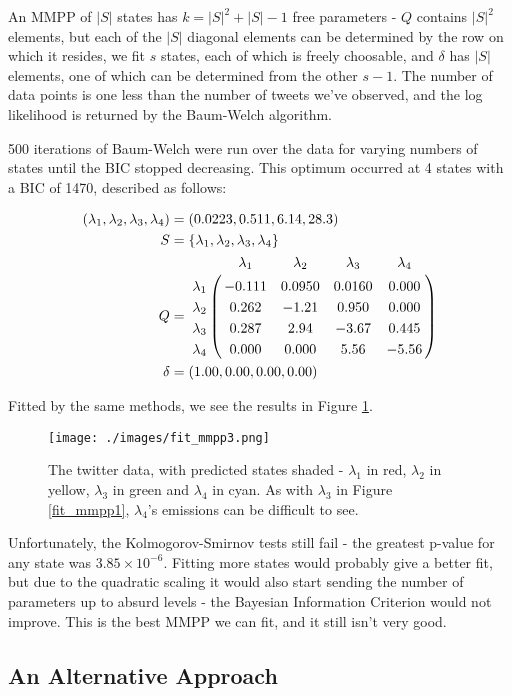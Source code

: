 An MMPP of $|S|$ states has $k=|S|^2+|S|-1$ free parameters - $Q$ contains $|S|^2$ elements, but each of the $|S|$ diagonal elements can be determined by the row on which it resides, we fit $s$ states, each of which is freely choosable, and $\delta$ has $|S|$ elements, one of which can be determined from the other $s-1$. The number of data points is one less than the number of tweets we've observed, and the log likelihood is returned by the Baum-Welch algorithm.

500 iterations of Baum-Welch were run over the data for varying numbers of states until the BIC stopped decreasing. This optimum occurred at 4 states with a BIC of 1470, described as follows:

\begin{align*}
(\lambda_1,\lambda_2,\lambda_3,\lambda_4) &= (0.0223,0.511,6.14,28.3)\\
S &= \{\lambda_1,\lambda_2,\lambda_3,\lambda_4\}\\
Q &= \bordermatrix{      & \lambda_1 & \lambda_2 & \lambda_3 & \lambda_4\cr
                \lambda_1 & -0.111 & 0.0950 & 0.0160 & 0.000 \cr
                \lambda_2 & 0.262  & -1.21  & 0.950  & 0.000 \cr
                \lambda_3 & 0.287  & 2.94   & -3.67  & 0.445 \cr
                \lambda_4 & 0.000  & 0.000  & 5.56   & -5.56 \cr
			}\\
\delta &= (1.00,0.00,0.00,0.00)
\end{align*}

Fitted by the same methods, we see the results in Figure \ref{fit_mmpp3}.

\begin{figure}[h!]
\centering
\texttt{[image: ./images/fit\_mmpp3.png]}
\caption{The twitter data, with predicted states shaded - $\lambda_1$ in red, $\lambda_2$ in yellow, $\lambda_3$ in green and $\lambda_4$ in cyan. As with $\lambda_3$ in Figure \ref{fit_mmpp1}, $\lambda_4$'s emissions can be difficult to see.}
\label{fit_mmpp3}
\end{figure}

Unfortunately, the Kolmogorov-Smirnov tests still fail - the greatest p-value for any state was $3.85 \times 10^{-6}$. Fitting more states would probably give a better fit, but due to the quadratic scaling it would also start sending the number of parameters up to absurd levels - the Bayesian Information Criterion would not improve. This is the best MMPP we can fit, and it still isn't very good.

\subsection{An Alternative Approach}

